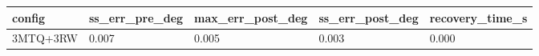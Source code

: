 \begin{tabular}{lllll}
\hline
config & ss\_err\_pre\_deg & max\_err\_post\_deg & ss\_err\_post\_deg & recovery\_time\_s \\
\hline
3MTQ+3RW & 0.007 & 0.005 & 0.003 & 0.000 \\
\hline
\end{tabular}
